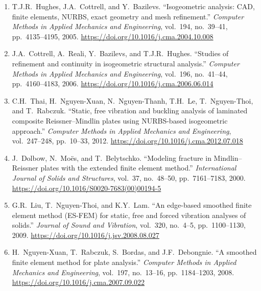 \documentclass[a4paper,10pt]{article}
\begin{document}
\begin{enumerate}
    \item \label{hughes2005}
    T.J.R.~Hughes, J.A.~Cottrell, and Y.~Bazilevs.
    ``Isogeometric analysis: CAD, finite elements, NURBS, exact geometry and 
    mesh refinement.''
    \emph{Computer Methods in Applied Mechanics and Engineering},
    vol.~194, no.~39--41, pp.~4135--4195, 2005.
    \newline \url{https://doi.org/10.1016/j.cma.2004.10.008}

    \item \label{cottrell2006}
    J.A.~Cottrell, A.~Reali, Y.~Bazilevs, and T.J.R.~Hughes.
    ``Studies of refinement and continuity in isogeometric structural analysis.''
    \emph{Computer Methods in Applied Mechanics and Engineering},
    vol.~196, no.~41--44, pp.~4160--4183, 2006.
    \newline \url{https://doi.org/10.1016/j.cma.2006.06.014}

    \item \label{thai2012}
    C.H.~Thai, H.~Nguyen-Xuan, N.~Nguyen-Thanh, T.H.~Le, T.~Nguyen-Thoi, 
    and T.~Rabczuk.
    ``Static, free vibration and buckling analysis of laminated composite 
    Reissner--Mindlin plates using NURBS-based isogeometric approach.''
    \emph{Computer Methods in Applied Mechanics and Engineering},
    vol.~247--248, pp.~10--33, 2012.
    \newline \url{https://doi.org/10.1016/j.cma.2012.07.018}

    \item \label{dolbow2000}
    J.~Dolbow, N.~Mo\"es, and T.~Belytschko.
    ``Modeling fracture in Mindlin--Reissner plates with the 
    extended finite element method.''
    \emph{International Journal of Solids and Structures},
    vol.~37, no.~48--50, pp.~7161--7183, 2000.
    \newline \url{https://doi.org/10.1016/S0020-7683(00)00194-5}

    \item \label{liu2009}
    G.R.~Liu, T.~Nguyen-Thoi, and K.Y.~Lam.
    ``An edge-based smoothed finite element method (ES-FEM) for static, free 
    and forced vibration analyses of solids.''
    \emph{Journal of Sound and Vibration}, vol.~320, no.~4--5, pp.~1100--1130, 2009.
    \newline \url{https://doi.org/10.1016/j.jsv.2008.08.027}

    \item \label{nguyenxuan2008}
    H.~Nguyen-Xuan, T.~Rabczuk, S.~Bordas, and J.F.~Debongnie.
    ``A smoothed finite element method for plate analysis.''
    \emph{Computer Methods in Applied Mechanics and Engineering},
    vol.~197, no.~13--16, pp.~1184--1203, 2008.
    \newline \url{https://doi.org/10.1016/j.cma.2007.09.022}


\end{enumerate}
\end{document}
